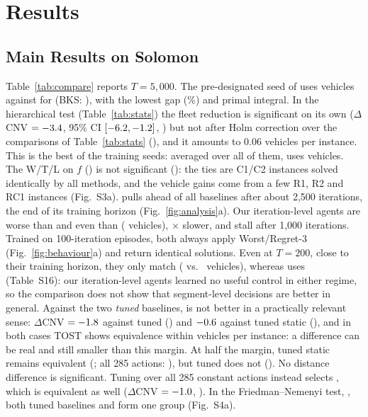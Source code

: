 \section{Results}\label{sec:results}

\subsection{Main Results on Solomon}\label{sec:main}
Table~\ref{tab:compare} reports $T=5{,}000$. The pre-designated seed of \sgalns{} uses
\rcnvSg{} vehicles against \rcnvRw{} for \Rw{} (BKS: \rcnvBks{}), with the lowest gap
(\rgapSg{}\%) and primal integral. In the hierarchical test (Table~\ref{tab:stats}) the
fleet reduction is significant on its own ($\Delta$CNV $=-3.4{}$, 95\% CI
$[-6.2, -1.2]{}$, \rstRwpNVt{}) but not after Holm correction over the comparisons of
Table~\ref{tab:stats} (\rstRwpNVholmt{}), and it amounts to 0.06 vehicles per
instance. This is the best of the \rseedN{} training seeds: averaged over all of
them, \sgalns{} uses \rseedCnv{} vehicles. The W/T/L on $f$ (\rcmpRwW{}) is not significant (\rcmpRwPt{}): the
\tTies{} ties are C1/C2 instances solved identically by all methods, and the vehicle
gains come from a few R1, R2 and RC1 instances (Fig.~S3a).
\sgalns{} pulls ahead of all baselines after about 2{,}500 iterations, the end of its
training horizon (Fig.~\ref{fig:analysis}a). Our iteration-level agents are worse than
\sgalns{} and even than \Rw{} (\rcnvIterG{} vehicles), \tIterSlow{}$\times$ slower, and
stall after 1{,}000 iterations. Trained on 100-iteration episodes, both always apply
Worst/Regret-3 (Fig.~\ref{fig:behaviour}a) and return identical solutions. %
Even at $T=200$, close to their training horizon, they only match \Rw{}
(\qShortItCnv{} vs.\ \qShortRwCnv{} vehicles), whereas \sgalns{} uses \qShortSgCnv{}
(Table~S16): our iteration-level agents
learned no useful control in either regime, so the comparison does not show that
segment-level decisions are better in general. %
Against the two \emph{tuned} baselines,
\sgalns{} is not better in a practically relevant sense: $\Delta$CNV $=-1.8{}$
against tuned \Rw{} (\rstRwtpNVt{}) and $-0.6{}$ against tuned static
(\rstStpNVt{}), and in both cases TOST shows equivalence within \rdeltaNV{} vehicles
per instance: a difference can be real and still smaller than this margin. At half the
margin, tuned static remains equivalent (\qTostHalfSt{}; all 285 actions: \qTostHalfFull{}),
but tuned \Rw{} does not (\qTostHalfRwt{}). %
 No distance
difference is significant. Tuning over all 285 constant
actions instead selects \rfullAct{}, which is equivalent as well ($\Delta$CNV
$=-1.0{}$, \rstFullpNVt{}). %
In the Friedman--Nemenyi test, \sgalns{}, both tuned baselines and \Rw{} form one
group (Fig.~S4a).

